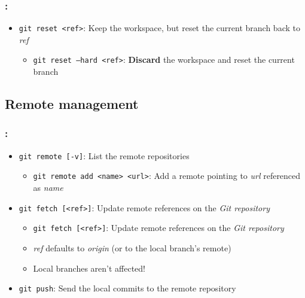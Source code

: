 \begin{frame}
    \frametitle{\secname: \small\subsecname\normalsize}

    \begin{itemize}
        \item \texttt{git reset <ref>}: Keep the workspace, but reset the current branch back to \textit{ref}
        \begin{itemize}
            \item \texttt{git reset --hard <ref>}: \textbf{Discard} the workspace and reset the current branch
        \end{itemize}
    \end{itemize}
\end{frame}

\subsection{Remote management}

\begin{frame}
    \frametitle{\secname: \small\subsecname\normalsize}

    \begin{itemize}
        \item \texttt{git remote [-v]}: List the remote repositories
        \begin{itemize}
            \item \texttt{git remote add <name> <url>}: Add a remote pointing to \textit{url} referenced as \textit{name}
        \end{itemize}
        \item \texttt{git fetch [<ref>]}: Update remote references on the \textit{Git repository}
        \begin{itemize}
        \item \texttt{git fetch [<ref>]}: Update remote references on the \textit{Git repository}
            \item \textit{ref} defaults to \textit{origin} (or to the local branch's remote)
            \item Local branches aren't affected!
        \end{itemize}
        \item \texttt{git push}: Send the local commits to the remote repository
    \end{itemize}
\end{frame}

